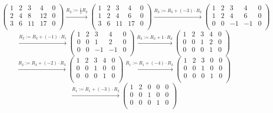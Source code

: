 \documentclass[a4paper]{article}
\begin{document}
\[
\left(
\begin{array}{cccc|c}
1 & 2 & 3 & 4 & 0   \\
2 & 4 & 8 & 12 & 0  \\
3 & 6 & 11 & 17 & 0 \\
\end{array}
\right)
\xrightarrow{\text{$R_2 := \frac{1}{2} R_2$}}
\left(
\begin{array}{cccc|c}
1 & 2 & 3 & 4 & 0   \\
1 & 2 & 4 & 6 & 0  \\
3 & 6 & 11 & 17 & 0 \\
\end{array}
\right)
\xrightarrow{\text{$R_3 := R_3 + (- 3) \cdot R_2$}}
\left(
\begin{array}{cccc|c}
1 & 2 & 3 & 4 & 0   \\
1 & 2 & 4 & 6 & 0  \\
0 & 0 & -1 & -1 & 0 \\
\end{array}
\right)
\]
\[
\xrightarrow{\text{$R_2 := R_2 + (-1) \cdot R_1$}}
\left(
\begin{array}{cccc|c}
1 & 2 & 3 & 4 & 0   \\
0 & 0 & 1 & 2 & 0  \\
0 & 0 & -1 & -1 & 0 \\
\end{array}
\right)
\xrightarrow{\text{$R_3 := R_3 + 1 \cdot R_2$}}
\left(
\begin{array}{cccc|c}
1 & 2 & 3 & 4 & 0   \\
0 & 0 & 1 & 2 & 0  \\
0 & 0 & 0 & 1 & 0 \\
\end{array}
\right)
\]
\[
\xrightarrow{\text{$R_2 := R_2 + (-2) \cdot R_3$}}
\left(
\begin{array}{cccc|c}
1 & 2 & 3 & 4 & 0   \\
0 & 0 & 1 & 0 & 0  \\
0 & 0 & 0 & 1 & 0 \\
\end{array}
\right)
\xrightarrow{\text{$R_1 := R_1 + (-4) \cdot R_3$}}
\left(
\begin{array}{cccc|c}
1 & 2 & 3 & 0 & 0   \\
0 & 0 & 1 & 0 & 0  \\
0 & 0 & 0 & 1 & 0 \\
\end{array}
\right)
\]
\[
\xrightarrow{\text{$R_1 := R_1 + (-3) \cdot R_2$}}
\left(
\begin{array}{cccc|c}
1 & 2 & 0 & 0 & 0   \\
0 & 0 & 1 & 0 & 0  \\
0 & 0 & 0 & 1 & 0 \\
\end{array}
\right)
\]
\end{document}
